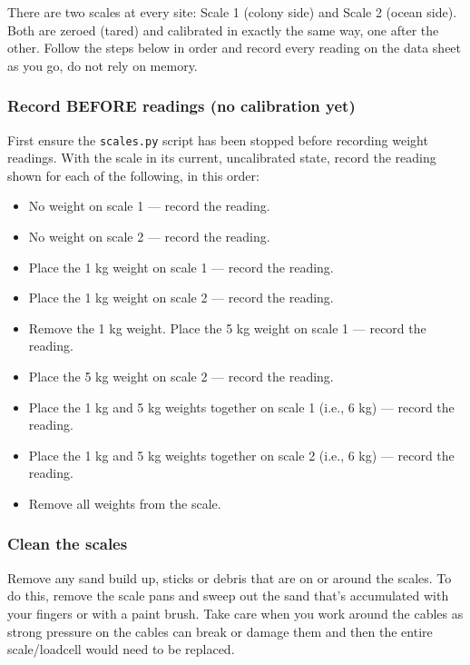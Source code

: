 \documentclass[
  letterpaper,
]{scrbook}
\begin{document}
There are two scales at every site: Scale 1 (colony side) and Scale 2
(ocean side). Both are zeroed (tared) and calibrated in exactly the same
way, one after the other. Follow the steps below in order and record
every reading on the data sheet as you go, do not rely on memory.

\subsubsection{Record BEFORE readings (no calibration
yet)}\label{record-before-readings-no-calibration-yet}

First ensure the \texttt{scales.py} script has been stopped before
recording weight readings. With the scale in its current, uncalibrated
state, record the reading shown for each of the following, in this
order:

\begin{itemize}
\item
  No weight on scale 1 --- record the reading.
\item
  No weight on scale 2 --- record the reading.
\item
  Place the 1 kg weight on scale 1 --- record the reading.
\item
  Place the 1 kg weight on scale 2 --- record the reading.
\item
  Remove the 1 kg weight. Place the 5 kg weight on scale 1 --- record
  the reading.
\item
  Place the 5 kg weight on scale 2 --- record the reading.
\item
  Place the 1 kg and 5 kg weights together on scale 1 (i.e., 6 kg) ---
  record the reading.
\item
  Place the 1 kg and 5 kg weights together on scale 2 (i.e., 6 kg) ---
  record the reading.
\item
  Remove all weights from the scale.
\end{itemize}

\subsubsection{Clean the scales}\label{clean-the-scales}

Remove any sand build up, sticks or debris that are on or around the
scales. To do this, remove the scale pans and sweep out the sand that's
accumulated with your fingers or with a paint brush. Take care when you
work around the cables as strong pressure on the cables can break or
damage them and then the entire scale/loadcell would need to be
replaced.
\end{document}
